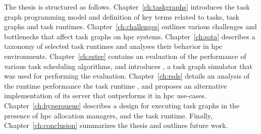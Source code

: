 The thesis is structured as follows. Chapter~\ref{ch:taskgraphs} introduces the task graph
programming model and definition of key terms related to tasks, task graphs and task runtimes.
Chapter~\ref{ch:challenges} outlines various challenges and bottlenecks that affect task graphs
on \gls{hpc} systems. Chapter~\ref{ch:sota} describes a taxonomy of selected
task runtimes and analyses their behavior in \gls{hpc} environments.
Chapter~\ref{ch:estee} contains an evaluation of the performance of various task scheduling
algorithms, and introduces \estee{}, a task graph simulator that was used for
performing the evaluation. Chapter~\ref{ch:rsds} details an analysis of the runtime
performance the task runtime \dask{}, and proposes an alternative implementation of
its server that outperforms it in \gls{hpc} use-cases. Chapter~\ref{ch:hyperqueue}
describes a design for executing task graphs in the presence of \gls{hpc} allocation
managers, and the \hyperqueue{} task runtime. Finally, Chapter~\ref{ch:conclusion}
summarizes the thesis and outlines future work.
